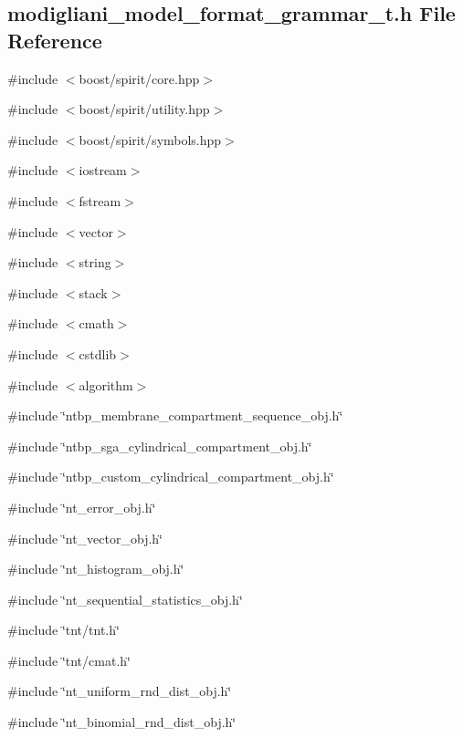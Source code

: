 \subsection{modigliani\_\-model\_\-format\_\-grammar\_\-t.h File Reference}
\label{modigliani__model__format__grammar__t_8h}
{\ttfamily \#include $<$boost/spirit/core.hpp$>$}\par
{\ttfamily \#include $<$boost/spirit/utility.hpp$>$}\par
{\ttfamily \#include $<$boost/spirit/symbols.hpp$>$}\par
{\ttfamily \#include $<$iostream$>$}\par
{\ttfamily \#include $<$fstream$>$}\par
{\ttfamily \#include $<$vector$>$}\par
{\ttfamily \#include $<$string$>$}\par
{\ttfamily \#include $<$stack$>$}\par
{\ttfamily \#include $<$cmath$>$}\par
{\ttfamily \#include $<$cstdlib$>$}\par
{\ttfamily \#include $<$algorithm$>$}\par
{\ttfamily \#include \char`\"{}ntbp\_\-membrane\_\-compartment\_\-sequence\_\-obj.h\char`\"{}}\par
{\ttfamily \#include \char`\"{}ntbp\_\-sga\_\-cylindrical\_\-compartment\_\-obj.h\char`\"{}}\par
{\ttfamily \#include \char`\"{}ntbp\_\-custom\_\-cylindrical\_\-compartment\_\-obj.h\char`\"{}}\par
{\ttfamily \#include \char`\"{}nt\_\-error\_\-obj.h\char`\"{}}\par
{\ttfamily \#include \char`\"{}nt\_\-vector\_\-obj.h\char`\"{}}\par
{\ttfamily \#include \char`\"{}nt\_\-histogram\_\-obj.h\char`\"{}}\par
{\ttfamily \#include \char`\"{}nt\_\-sequential\_\-statistics\_\-obj.h\char`\"{}}\par
{\ttfamily \#include \char`\"{}tnt/tnt.h\char`\"{}}\par
{\ttfamily \#include \char`\"{}tnt/cmat.h\char`\"{}}\par
{\ttfamily \#include \char`\"{}nt\_\-uniform\_\-rnd\_\-dist\_\-obj.h\char`\"{}}\par
{\ttfamily \#include \char`\"{}nt\_\-binomial\_\-rnd\_\-dist\_\-obj.h\char`\"{}}\par
